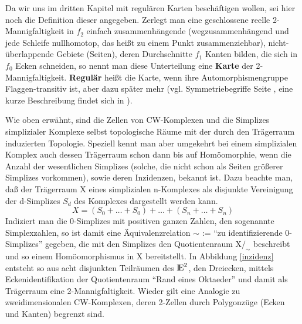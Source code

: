Da wir uns im dritten Kapitel mit regulären Karten beschäftigen wollen,
sei hier noch die Definition dieser angegeben. Zerlegt man eine geschlossene
reelle 2-Man\-nig\-fal\-tig\-keit in $f_2$ einfach zusammenhängende
(wegzusammenhängend und jede Schleife nullhomotop, das heißt zu einem Punkt
zusammenziehbar), nicht-überlappende Gebiete (Seiten), deren Durchschnitte
$f_1$ Kanten bilden, die sich in $f_0$ Ecken schneiden, so nennt man diese
Unterteilung eine {\bf Karte} der 2-Mannigfaltigkeit. {\bf Regulär} heißt die
Karte, wenn ihre Automorphismengruppe Flaggen-transitiv ist, aber dazu später
mehr (vgl. Symmetriebegriffe Seite \pageref{flag}, eine kurze Beschreibung
findet sich in \cite{BoWi:87}).

Wie oben erwähnt, sind die Zellen von CW-Komplexen und die Simplizes
simplizialer Komplexe selbst topologische Räume mit der durch den Trägerraum
induzierten Topologie. Speziell kennt man aber umgekehrt bei einem
simplizialen Komplex auch dessen Trägerraum schon dann bis auf Homöomorphie,
wenn die Anzahl der wesentlichen Simplizes (solche, die nicht schon als
Seiten größerer Simplizes vorkommen), sowie deren Inzidenzen, bekannt ist.
Dazu beachte man, daß der Trägerraum X eines simplizialen n-Komplexes als
disjunkte Vereinigung der d-Simplizes $S_d$ des Kom\-plex\-es dargestellt werden
kann.
$$X=(S_0+\ldots+S_0)+\ldots+(S_n+\ldots+S_n)$$
Indiziert man die 0-Simplizes mit positiven ganzen Zahlen, den sogenannte
Simplexzahlen, so ist damit eine Äquivalenzrelation $\sim$ :=
"`zu identifizierende 0-Simplizes"' gegeben, die mit den Simplizes den
Quotientenraum X$/_\sim$ beschreibt und so einem Homöomorphismus in X
bereitstellt. In Abbildung \ref{inzidenz} entsteht so aus acht disjunkten
Teilräumen des $\mbox{$\rm I\!E$}^2$, den Dreiecken, mittels Eckenidentifikation der
Quotientenraum "`Rand eines Oktaeder"' und damit als Trägerraum eine
2-Mannigfaltigkeit. Wieder gilt eine Analogie zu zweidimensionalen CW-Komplexen,
deren 2-Zellen durch Polygonzüge (Ecken und Kanten) begrenzt sind.


